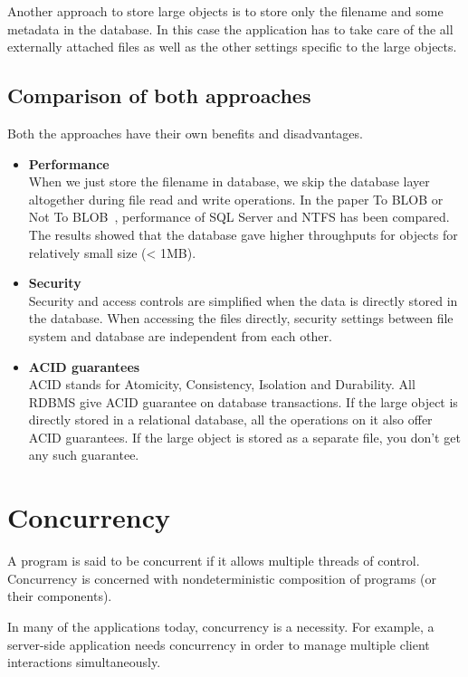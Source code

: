 Another approach to store large objects is to store only the filename and some metadata in the database. In this case the application has to take care of the all externally attached files as well as the other settings specific to the large objects.

\subsection{Comparison of both approaches}
Both the approaches have their own benefits and disadvantages.

\begin{itemize}
  \item{\textbf{Performance}} \\
    When we just store the filename in database, we skip the database layer altogether during file read and write operations. In the paper To BLOB or Not To BLOB~\cite{sears2007blob}, performance of SQL Server and NTFS has been compared. The results showed that the database gave higher throughputs for objects for relatively small size (< 1MB).

  \item{\textbf{Security}} \\
    Security and access controls are simplified when the data is directly stored in the database. When accessing the files directly, security settings between file system and database are independent from each other.

  \item{\textbf{ACID guarantees}} \\
    ACID stands for Atomicity, Consistency, Isolation and Durability. All RDBMS give ACID guarantee on database transactions. If the large object is directly stored in a relational database, all the operations on it also offer ACID guarantees. If the large object is stored as a separate file, you don't get any such guarantee.
\end{itemize}

\section{Concurrency}
A program is said to be concurrent if it allows multiple threads of control. Concurrency is concerned with nondeterministic composition of programs (or their components).

In many of the applications today, concurrency is a necessity. For example, a server-side application needs concurrency in order to manage multiple client interactions simultaneously.

